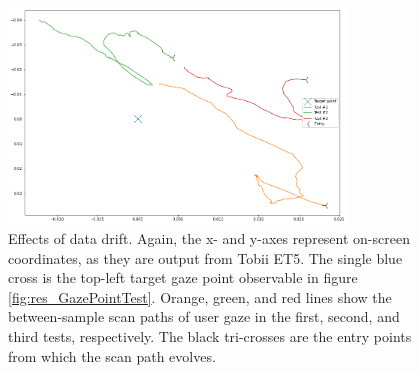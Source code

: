 \begin{figure}[h]
    \centering
    \includegraphics[width=0.8\textwidth]{Images/DataQuality/DataDrift.png}
    \caption{Effects of data drift. Again, the x- and y-axes represent on-screen coordinates, as they are output from Tobii ET5. The single blue cross is the top-left target gaze point observable in figure \ref{fig:res_GazePointTest}. Orange, green, and red lines show the between-sample scan paths of user gaze in the first, second, and third tests, respectively. The black tri-crosses are the entry points from which the scan path evolves.}
    \label{fig:res_DataDrift}
\end{figure}



